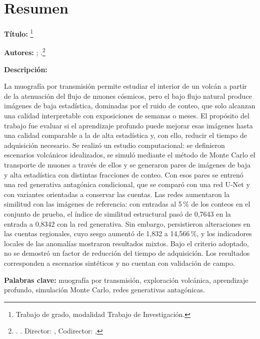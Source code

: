\chapter*{Resumen}
\label{pre:resumen}

\begingroup
{}
\setlength{\parindent}{0pt}
\setlength{\parskip}{0.7em}

\textbf{Título:} \TituloTrabajo\footnote{Trabajo de grado, modalidad Trabajo de Investigación.}

\textbf{Autores:} \AutorUno; \AutorDos.\footnote{\Facultad. \Escuela. Director: \DirectorNombre, \DirectorTitulo Codirector: \CodirectorNombre, \CodirectorTitulo}

\textbf{Descripción:}

La muografía por transmisión permite estudiar el interior de un volcán a partir de la atenuación del flujo de muones cósmicos, pero el bajo flujo natural produce imágenes de baja estadística, dominadas por el ruido de conteo, que solo alcanzan una calidad interpretable con exposiciones de semanas o meses. El propósito del trabajo fue evaluar si el aprendizaje profundo puede mejorar esas imágenes hasta una calidad comparable a la de alta estadística y, con ello, reducir el tiempo de adquisición necesario. Se realizó un estudio computacional: se definieron escenarios volcánicos idealizados, se simuló mediante el método de Monte Carlo el transporte de muones a través de ellos y se generaron pares de imágenes de baja y alta estadística con distintas fracciones de conteo. Con esos pares se entrenó una red generativa antagónica condicional, que se comparó con una red U-Net y con variantes orientadas a conservar las cuentas. Las redes aumentaron la similitud con las imágenes de referencia: con entradas al 5\,\% de los conteos en el conjunto de prueba, el índice de similitud estructural pasó de 0,7643 en la entrada a 0,8342 con la red generativa. Sin embargo, persistieron alteraciones en las cuentas regionales, cuyo sesgo aumentó de 1,832 a 14,566\,\%, y los indicadores locales de las anomalías mostraron resultados mixtos. Bajo el criterio adoptado, no se demostró un factor de reducción del tiempo de adquisición. Los resultados corresponden a escenarios sintéticos y no cuentan con validación de campo.

\textbf{Palabras clave:} muografía por transmisión, exploración volcánica, aprendizaje profundo, simulación Monte Carlo, redes generativas antagónicas.

\endgroup
